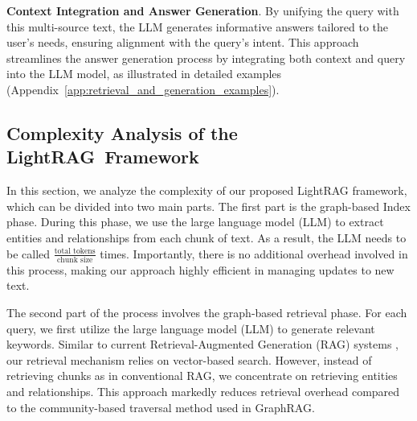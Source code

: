 \documentclass{article} %
\def\model{LightRAG}
\begin{document}
\textbf{Context Integration and Answer Generation}. By unifying the query with this multi-source text, the LLM generates informative answers tailored to the user's needs, ensuring alignment with the query's intent. This approach streamlines the answer generation process by integrating both context and query into the LLM model, as illustrated in detailed examples (Appendix~\ref{app:retrieval_and_generation_examples}).

\subsection{Complexity Analysis of the \model\ Framework}
In this section, we analyze the complexity of our proposed LightRAG framework, which can be divided into two main parts. The first part is the graph-based Index phase. During this phase, we use the large language model (LLM) to extract entities and relationships from each chunk of text. As a result, the LLM needs to be called \(\frac{\text{total tokens}}{\text{chunk size}}\) times. Importantly, there is no additional overhead involved in this process, making our approach highly efficient in managing updates to new text.

The second part of the process involves the graph-based retrieval phase. For each query, we first utilize the large language model (LLM) to generate relevant keywords. Similar to current Retrieval-Augmented Generation (RAG) systems \cite{gao2023retrieval, hyde, chan2024rq}, our retrieval mechanism relies on vector-based search. However, instead of retrieving chunks as in conventional RAG, we concentrate on retrieving entities and relationships. This approach markedly reduces retrieval overhead compared to the community-based traversal method used in GraphRAG.
\end{document}
